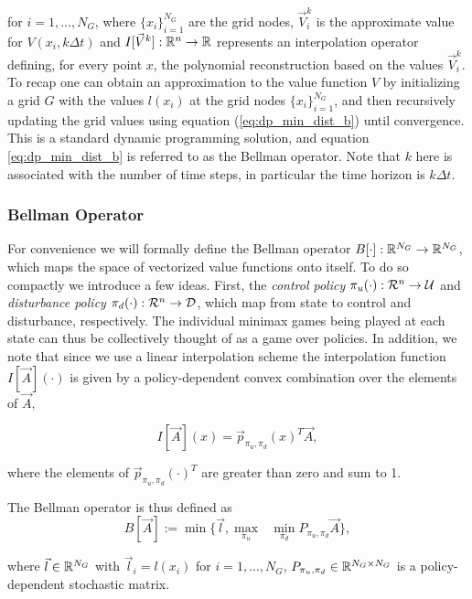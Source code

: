 \documentclass[letterpaper, 10 pt, conference]{ieeeconf}
\begin{document}
\noindent for  $i=1, ..., N_G$, where $\{x_i\}_{i=1}^{N_G}$ are the grid nodes, $\vec{V}_i^k$ is the approximate value for $V(x_i, k \Delta t)$ and $I[\vec{V}^k]:\mathbb{R}^n \rightarrow \mathbb{R}$ represents an interpolation operator defining, for every point $x$, the polynomial reconstruction based on the values $\vec{V}_i^k$. To recap one can obtain an approximation to the value function $V$ by initializing a grid $G$ with the values $l(x_i)$ at the grid nodes $\{x_i\}_{i=1}^{N_G}$, and then recursively updating the grid values using equation (\ref{eq:dp_min_dist_b}) until convergence. This is a standard dynamic programming solution, and equation \ref{eq:dp_min_dist_b} is referred to as the Bellman operator. Note that $k$ here is associated with the number of time steps, in particular the time horizon is $k \Delta t$.

\subsubsection{Bellman Operator}
For convenience we will formally define the Bellman operator $B[\cdot]: \mathbb{R}^{N_G} \rightarrow \mathbb{R}^{N_G}$, which maps the space of vectorized value functions onto itself. To do so compactly we introduce a few ideas. First, the \emph{control policy} $\pi_u(\cdot): \mathcal{R}^n \rightarrow \mathcal{U}$ and \emph{disturbance policy} $\pi_d(\cdot): \mathcal{R}^n \rightarrow \mathcal{D}$, which map from state to control and disturbance, respectively. The individual minimax games being played at each state can thus be collectively thought of as a game over policies. In addition, we note that since we use a linear interpolation scheme the interpolation function $I[\vec{A}](\cdot)$ is given by a policy-dependent convex combination over the elements of $\vec{A}$,

\begin{equation}
I[\vec{A}](x)= \vec{p}_{\pi_u,\pi_d}(x)^T \vec{A},
\end{equation}

\noindent where the elements of $\vec{p}_{\pi_u,\pi_d}(\cdot)^T$ are greater than zero and sum to 1. 

The Bellman operator is thus defined as 
\begin{equation} \label{eq:bell}
 B[\vec{A}] := \min\{\vec{l},  \underset{\pi_u}{\max}\text{ }\underset{ \pi_d}{\min} P_{\pi_u, \pi_d} \vec{A}\},
\end{equation}

\noindent where $\vec{l} \in \mathbb{R}^{N_G}$ with $\vec{l}_i = l(x_i)$ for $i=1, ..., N_G$, $P_{\pi_u, \pi_d} \in \mathbb{R}^{N_G \times N_G}$ is a policy-dependent stochastic matrix.
\end{document}
